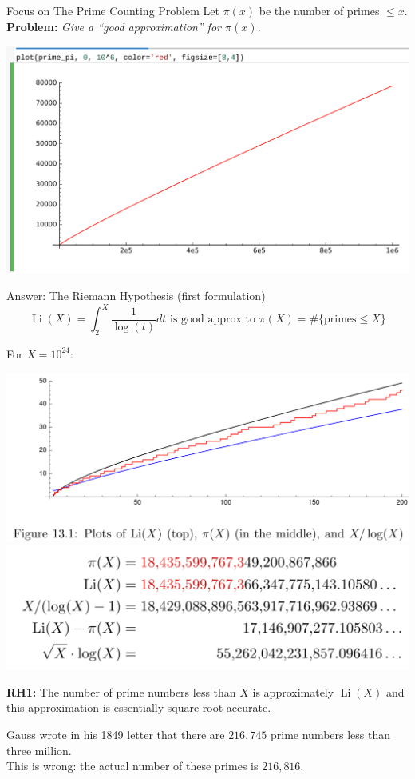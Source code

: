 \documentclass{beamer}
\DeclareMathOperator{\Li}{Li}
\begin{document}
\begin{frame}{Focus on The Prime Counting Problem}
  Let $\pi(x)$ be the number of primes $\leq x$.\\
  {\bf Problem:} {\em Give a ``good approximation'' for $\pi(x)$.}
  \vfill

  \includegraphics[width=.98\textwidth]{pics/prime-pi-1000000}

\end{frame}

\begin{frame}{Answer: The Riemann Hypothesis (first formulation)}
  $$
  \Li(X) = \int_2^{X} \frac{1}{\log(t)} dt
  \text{ is good approx to }
  \pi(X) = \#\{\text{primes} \leq X\}
  $$

\begin{flushright}
  \tiny For $X=10^{24}$:
\end{flushright}

  \begin{center}    \includegraphics[width=.47\textwidth]{pics/plot-pi-Li}
\includegraphics[width=.47\textwidth]{pics/ten24}
  \end{center}


  \begin{block}{}
    \textbf{RH1:} The number of prime numbers less than $X$ is
    approximately $\Li(X)$ and this approximation is essentially square
    root accurate.
  \end{block}

\hrulefill

{\tiny Gauss wrote in his 1849 letter  that
there are $216{,}745$ prime numbers less than three million.\vspace{-1em}\\

This is
wrong: the actual number of these primes is $216{,}816$.}
\end{frame}
\end{document}
